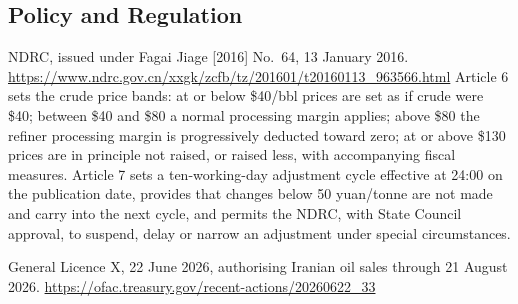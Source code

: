\documentclass[11pt]{article}
\begin{document}
\subsection*{Policy and Regulation}
\begin{description}[leftmargin=0.9em,style=nextline,itemsep=0.2em,parsep=0pt,topsep=0.2em]
\item[Petroleum Price Management Measures (\emph{Shiyou Jiage Guanli Banfa})]
NDRC, issued under Fagai Jiage [2016] No.~64, 13 January 2016.
\url{https://www.ndrc.gov.cn/xxgk/zcfb/tz/201601/t20160113_963566.html}
Article 6 sets the crude price bands: at or below \$40/bbl prices are set as if crude
were \$40; between \$40 and \$80 a normal processing margin applies; above \$80 the
refiner processing margin is progressively deducted toward zero; at or above \$130
prices are in principle not raised, or raised less, with accompanying fiscal
measures. Article 7 sets a ten-working-day adjustment cycle effective at 24:00 on
the publication date, provides that changes below 50 yuan/tonne are not made and
carry into the next cycle, and permits the NDRC, with State Council approval, to
suspend, delay or narrow an adjustment under special circumstances.
\item[US Treasury OFAC] General Licence X, 22 June 2026, authorising Iranian oil
sales through 21 August 2026.
\url{https://ofac.treasury.gov/recent-actions/20260622_33}
\end{description}
\end{document}
